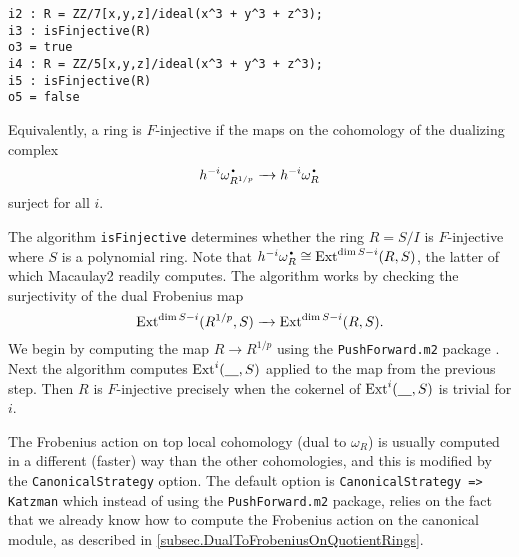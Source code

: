\documentclass[11pt]{amsart}
\begin{document}
\begin{verbatim}
i2 : R = ZZ/7[x,y,z]/ideal(x^3 + y^3 + z^3);
i3 : isFinjective(R)
o3 = true
i4 : R = ZZ/5[x,y,z]/ideal(x^3 + y^3 + z^3);
i5 : isFinjective(R)
o5 = false
\end{verbatim}

Equivalently, a ring is $F$-injective if the maps on the cohomology of the dualizing complex
\[
h^{-i} \omega_{R^{1/p}}^{\mydot} \to h^{-i} \omega_R^{\mydot}
\]
surject for all $i$.

The algorithm {\tt isFinjective} determines whether the ring $R = S/I$ is
$F$-injective where $S$ is a polynomial ring.  Note that $h^{-i} \omega_R^{\mydot} \cong \Ext^{\dim S - i}(R, S)$, the latter of which Macaulay2 readily computes.
The algorithm works by checking the surjectivity of the dual Frobenius map
\[
\operatorname{Ext}^{\dim S - i}(R^{1/p}, S) \xrightarrow{\ \ } \operatorname{Ext}^{\dim S - i}(R, S).
\]
We begin by computing the map $R
\rightarrow R^{1/p}$ using the {\tt PushForward.m2} package \cite{PushForward}.
Next the algorithm computes
$\operatorname{Ext}^{i}( \underline{\hskip 10pt}, S)$ applied to the map from the previous step.  Then $R$ is $F$-injective precisely when the
cokernel of $\operatorname{Ext}^{i}( \underline{\hskip 10pt}, S)$ is trivial for $i$.

The Frobenius action on top local cohomology (dual to $\omega_R$) is usually computed in a different (faster) way than the other cohomologies, and this is modified by the {\tt CanonicalStrategy} option.  The default option is {\tt CanonicalStrategy => Katzman} which instead of using the {\tt PushForward.m2} package, relies on the fact that we already know how to compute the Frobenius action on the canonical module, as described in \autoref{subsec.DualToFrobeniusOnQuotientRings}.


\end{document}
